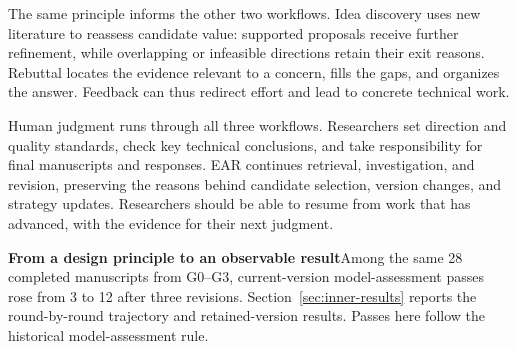 The same principle informs the other two workflows. Idea discovery uses new literature to reassess candidate value: supported proposals receive further refinement, while overlapping or infeasible directions retain their exit reasons. Rebuttal locates the evidence relevant to a concern, fills the gaps, and organizes the answer. Feedback can thus redirect effort and lead to concrete technical work.

Human judgment runs through all three workflows. Researchers set direction and quality standards, check key technical conclusions, and take responsibility for final manuscripts and responses. EAR continues retrieval, investigation, and revision, preserving the reasons behind candidate selection, version changes, and strategy updates. Researchers should be able to resume from work that has advanced, with the evidence for their next judgment.

\begin{insight}
\textbf{From a design principle to an observable result}\quad Among the same 28 completed manuscripts from G0--G3, current-version model-assessment passes rose from 3 to 12 after three revisions. Section~\ref{sec:inner-results} reports the round-by-round trajectory and retained-version results. Passes here follow the historical model-assessment rule.
\end{insight}
